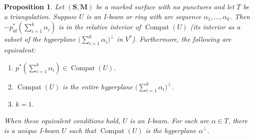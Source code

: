 \documentclass{amsart}
\newtheorem{prop}[proposition]{Proposition}
\theoremstyle{definition}
\theoremstyle{remark}
\numberwithin{equation}{section}
\newcommand{\uf}{{\operatorname{uf}}}
\newcommand{\0}{{\mathbf{0}}}
\newcommand{\M}{\mathbf{M}}
\renewcommand{\S}{\mathbf{S}}
\newcommand{\Compat}{\operatorname{Compat}}
\begin{document}
\begin{prop}\label{basic wall no punct}
Let $(\S,\M)$ be a marked surface \emph{with no punctures} and let $T$ be a triangulation.
Suppose $U$ is an I-beam or ring with arc sequence $\alpha_1,\ldots,\alpha_k$.
Then $-p^*_\uf(\sum_{i=1}^k\alpha_i)$ is in the relative interior of $\Compat(U)$ (its interior as a subset of the hyperplane $\bigl(\sum_{i=1}^k\alpha_i\bigr)^\perp$ in $V^*$).
Furthermore, the following are equivalent:
\begin{enumerate}[\quad\rm(i)]
\item \label{incoming}
$p^*(\sum_{i=1}^k\alpha_i)\in\Compat(U)$.
\item \label{compatU hyp}
$\Compat(U)$ is the entire hyperplane $\bigl(\sum_{i=1}^k\alpha_i\bigr)^\perp$.
\item \label{seq is a1}
$k=1$.
\end{enumerate}
When these equivalent conditions hold, $U$ is an I-beam.
For each arc $\alpha\in T$, there is a unique I-beam $U$ such that $\Compat(U)$ is the hyperplane $\alpha^\perp$.
\end{prop}
\end{document}
